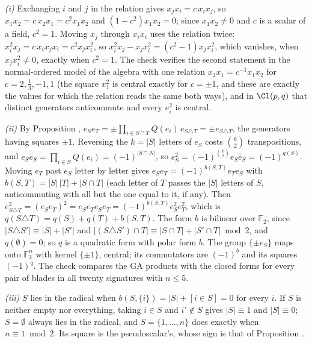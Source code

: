\emph{(i)} Exchanging $i$ and $j$ in the relation gives $x_{j}x_{i} = c\,x_{i}x_{j}$, so $x_{1}x_{2} = c\,x_{2}x_{1} = c^{2}x_{1}x_{2}$ and $(1 - c^{2})x_{1}x_{2} = 0$; since $x_{1}x_{2} \ne 0$ and $c$ is a scalar of a field, $c^{2} = 1$. Moving $x_{j}$ through $x_{i}x_{i}$ uses the relation twice: $x_{i}^{2}x_{j} = c\,x_{i}x_{j}x_{i} = c^{2}x_{j}x_{i}^{2}$, so $x_{i}^{2}x_{j} - x_{j}x_{i}^{2} = (c^{2} - 1)x_{j}x_{i}^{2}$, which vanishes, when $x_{j}x_{i}^{2} \ne 0$, exactly when $c^{2} = 1$. The check verifies the second statement in the normal-ordered model of the algebra with one relation $x_{2}x_{1} = c^{-1}x_{1}x_{2}$ for $c = 2, \tfrac13, -1, 1$ (the square $x_{1}^{2}$ is central exactly for $c = \pm 1$, and these are exactly the values for which the relation reads the same both ways), and in $\Cl(p,q)$ that distinct generators anticommute and every $e_{i}^{2}$ is central.

\emph{(ii)} By Proposition , $e_{S}e_{T} = \pm \prod_{i \in S \cap T} Q(e_{i})\, e_{S \triangle T} = \pm e_{S \triangle T}$, the generators having squares $\pm 1$. Reversing the $k = |S|$ letters of $e_{S}$ costs $\binom{k}{2}$ transpositions, and $e_{S}\widetilde{e_{S}} = \prod_{i \in S}Q(e_{i}) = (-1)^{|S \cap N|}$, so $e_{S}^{2} = (-1)^{\binom{k}{2}}e_{S}\widetilde{e_{S}} = (-1)^{q(S)}$. Moving $e_{T}$ past $e_{S}$ letter by letter gives $e_{S}e_{T} = (-1)^{b(S,T)}e_{T}e_{S}$ with $b(S,T) = |S|\,|T| + |S \cap T|$ (each letter of $T$ passes the $|S|$ letters of $S$, anticommuting with all but the one equal to it, if any). Then $e_{S \triangle T}^{2} = (e_{S}e_{T})^{2} = e_{S}e_{T}e_{S}e_{T} = (-1)^{b(S,T)}e_{S}^{2}e_{T}^{2}$, which is $q(S \triangle T) = q(S) + q(T) + b(S,T)$. The form $b$ is bilinear over $\mathbb{F}_{2}$, since $|S \triangle S'| \equiv |S| + |S'|$ and $|(S \triangle S') \cap T| \equiv |S \cap T| + |S' \cap T| \bmod 2$, and $q(\emptyset) = 0$; so $q$ is a quadratic form with polar form $b$. The group $\{\pm e_{S}\}$ maps onto $\mathbb{F}_{2}^{n}$ with kernel $\{\pm 1\}$, central; its commutators are $(-1)^{b}$ and its squares $(-1)^{q}$. The check compares the GA products with the closed forms for every pair of blades in all twenty signatures with $n \le 5$.

\emph{(iii)} $S$ lies in the radical when $b(S, \{i\}) = |S| + [i \in S] = 0$ for every $i$. If $S$ is neither empty nor everything, taking $i \in S$ and $i' \notin S$ gives $|S| \equiv 1$ and $|S| \equiv 0$; $S = \emptyset$ always lies in the radical, and $S = \{1, \dots, n\}$ does exactly when $n \equiv 1 \bmod 2$. Its square is the pseudoscalar's, whose sign is that of Proposition .

